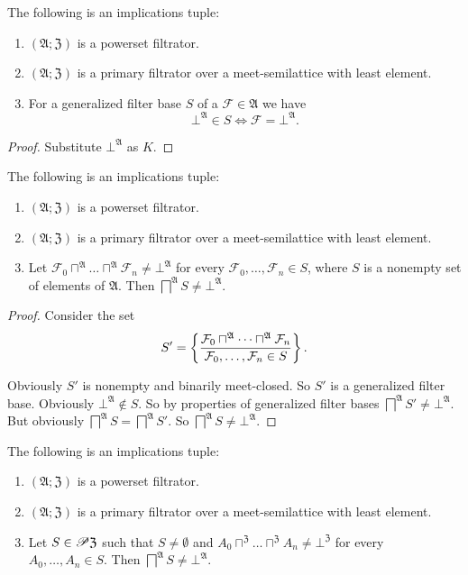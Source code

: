 \begin{cor}
\label{genbase-corr}The following is an implications tuple:
\begin{enumerate}
\item $(\mathfrak{A};\mathfrak{Z})$ is a powerset filtrator.
\item $(\mathfrak{A};\mathfrak{Z})$ is a primary filtrator over a meet-semilattice
with least element.
\item For a generalized filter base $S$ of a $\mathcal{F}\in\mathfrak{A}$
we have
\[
\bot^{\mathfrak{A}}\in S\Leftrightarrow\mathcal{F}=\bot^{\mathfrak{A}}.
\]

\end{enumerate}
\end{cor}
\begin{proof}
Substitute $\bot^{\mathfrak{A}}$ as $K$.\end{proof}
\begin{thm}
\label{genbase-f-closed}The following is an implications tuple:
\begin{enumerate}
\item $(\mathfrak{A};\mathfrak{Z})$ is a powerset filtrator.
\item $(\mathfrak{A};\mathfrak{Z})$ is a primary filtrator over a meet-semilattice
with least element.
\item Let $\mathcal{F}_{0}\sqcap^{\mathfrak{A}}\dots\sqcap^{\mathfrak{A}}\mathcal{F}_{n}\ne\bot^{\mathfrak{A}}$
for every $\mathcal{F}_{0},\dots,\mathcal{F}_{n}\in S$, where $S$
is a nonempty set of elements of $\mathfrak{A}$. Then $\bigsqcap^{\mathfrak{A}}S\ne\bot^{\mathfrak{A}}$.
\end{enumerate}
\end{thm}
\begin{proof}
Consider the set
\[
S'=\left\{ \frac{\mathcal{F}_{0}\sqcap^{\mathfrak{A}}\dots\sqcap^{\mathfrak{A}}\mathcal{F}_{n}}{\mathcal{F}_{0},\dots,\mathcal{F}_{n}\in S}\right\}.
\]


Obviously $S'$ is nonempty and binarily meet-closed. So $S'$ is
a generalized filter base. Obviously $\bot^{\mathfrak{A}}\notin S$.
So by properties of generalized filter bases $\bigsqcap^{\mathfrak{A}}S'\ne\bot^{\mathfrak{A}}$.
But obviously $\bigsqcap^{\mathfrak{A}}S=\bigsqcap^{\mathfrak{A}}S'$.
So $\bigsqcap^{\mathfrak{A}}S\ne\bot^{\mathfrak{A}}$.\end{proof}
\begin{cor}
\label{princ-fbase}The following is an implications tuple:
\begin{enumerate}
\item \label{princ-fbase-p}$(\mathfrak{A};\mathfrak{Z})$ is a powerset
filtrator.
\item \label{princ-fbase-fltr}$(\mathfrak{A};\mathfrak{Z})$ is a primary
filtrator over a meet-semilattice with least element.
\item \label{princ-fbase-conc}Let $S\in\mathscr{P}\mathfrak{Z}$ such that
$S\ne\emptyset$ and $A_{0}\sqcap^{\mathfrak{Z}}\dots\sqcap^{\mathfrak{Z}}A_{n}\ne\bot^{\mathfrak{Z}}$
for every $A_{0},\dots,A_{n}\in S$. Then $\bigsqcap^{\mathfrak{A}}S\ne\bot^{\mathfrak{A}}$.
\end{enumerate}
\end{cor}
